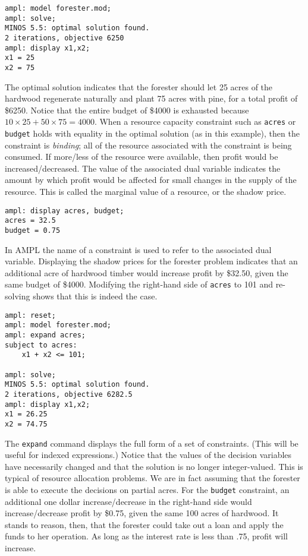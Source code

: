 \begin{Verbatim}[samepage=true]
ampl: model forester.mod;
ampl: solve;
MINOS 5.5: optimal solution found.
2 iterations, objective 6250
ampl: display x1,x2;
x1 = 25
x2 = 75
\end{Verbatim}

The optimal solution indicates that the forester should let 25 acres
of the hardwood regenerate naturally and plant 75 acres with pine, for
a total profit of \$6250. Notice that the entire budget of \$4000 is
exhausted because $10 \times 25 + 50 \times 75 = 4000$. When a
resource capacity constraint such as \texttt{acres} or \texttt{budget}
holds with equality in the optimal solution (as in this example), then
the constraint is \emph{binding}; all of the resource associated with
the constraint is being consumed. If more/less of the resource were
available, then profit would be increased/decreased. The value of the
associated dual variable indicates the amount by which profit would be
affected for small changes in the supply of the resource. This is
called the marginal value of a resource, or the shadow price.

\begin{Verbatim}[samepage=true]
ampl: display acres, budget;
acres = 32.5
budget = 0.75
\end{Verbatim}

In AMPL the name of a constraint is used to refer to the associated
dual variable. Displaying the shadow prices for the forester problem
indicates that an additional acre of hardwood timber would increase
profit by \$32.50, given the same budget of \$4000.  Modifying the
right-hand side of \texttt{acres} to 101 and re-solving shows that
this is indeed the case.

\begin{Verbatim}[samepage=true]
ampl: reset;
ampl: model forester.mod;
ampl: expand acres;
subject to acres:
	x1 + x2 <= 101;

ampl: solve;
MINOS 5.5: optimal solution found.
2 iterations, objective 6282.5
ampl: display x1,x2;
x1 = 26.25
x2 = 74.75
\end{Verbatim}

The \texttt{expand} command displays the full form of a set of
constraints.  (This will be useful for indexed expressions.) Notice
that the values of the decision variables have necessarily changed and
that the solution is no longer integer-valued.  This is typical of
resource allocation problems. We are in fact assuming that the
forester is able to execute the decisions on partial acres.  For the
\texttt{budget} constraint, an additional one dollar increase/decrease
in the right-hand side would increase/decrease profit by \$0.75, given
the same 100 acres of hardwood. It stands to reason, then, that the
forester could take out a loan and apply the funds to her
operation. As long as the interest rate is less than .75, profit will
increase.

